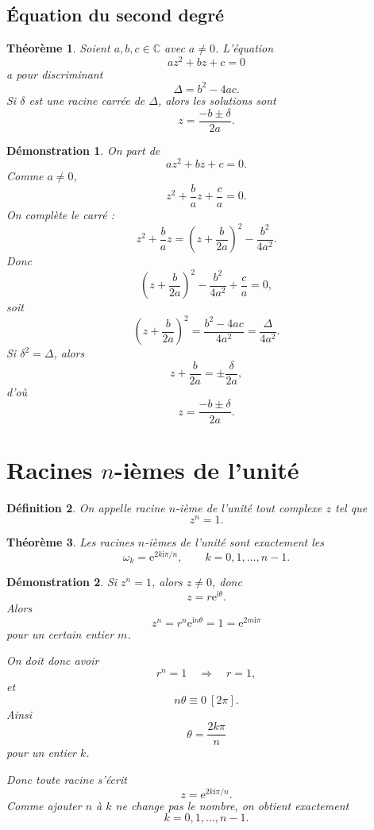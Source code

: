 \documentclass[11pt,a4paper]{article}
\newtheorem{definition}{Définition}[section]
\newtheorem{theoreme}[definition]{Théorème}
\newtheorem*{demonstration}{Démonstration}
\newcommand{\C}{\mathbb{C}}
\newcommand{\ii}{\mathrm{i}}
\newcommand{\e}{\mathrm{e}}
\begin{document}
\subsection{Équation du second degré}

\begin{theoreme}
Soient $a,b,c\in \C$ avec $a\neq 0$. L'équation
\[
az^2+bz+c=0
\]
a pour discriminant
\[
\Delta=b^2-4ac.
\]
Si $\delta$ est une racine carrée de $\Delta$, alors les solutions sont
\[
z=\frac{-b\pm \delta}{2a}.
\]
\end{theoreme}

\begin{demonstration}
On part de
\[
az^2+bz+c=0.
\]
Comme $a\neq 0$,
\[
z^2+\frac{b}{a}z+\frac{c}{a}=0.
\]
On complète le carré :
\[
z^2+\frac{b}{a}z
=
\left(z+\frac{b}{2a}\right)^2-\frac{b^2}{4a^2}.
\]
Donc
\[
\left(z+\frac{b}{2a}\right)^2-\frac{b^2}{4a^2}+\frac{c}{a}=0,
\]
soit
\[
\left(z+\frac{b}{2a}\right)^2
=\frac{b^2-4ac}{4a^2}
=\frac{\Delta}{4a^2}.
\]
Si $\delta^2=\Delta$, alors
\[
z+\frac{b}{2a}=\pm \frac{\delta}{2a},
\]
d'où
\[
z=\frac{-b\pm \delta}{2a}.
\]
\end{demonstration}

\section{Racines $n$-ièmes de l'unité}

\begin{definition}
On appelle \emph{racine $n$-ième de l'unité} tout complexe $z$ tel que
\[
z^n=1.
\]
\end{definition}

\begin{theoreme}
Les racines $n$-ièmes de l'unité sont exactement les
\[
\omega_k=\e^{2k\ii\pi/n},
\qquad k=0,1,\dots,n-1.
\]
\end{theoreme}

\begin{demonstration}
Si $z^n=1$, alors $z\neq 0$, donc
\[
z=r\e^{\ii\theta}.
\]
Alors
\[
z^n=r^n\e^{\ii n\theta}=1=\e^{2m\ii\pi}
\]
pour un certain entier $m$.

On doit donc avoir
\[
r^n=1 \quad \Rightarrow \quad r=1,
\]
et
\[
n\theta\equiv 0 \ [2\pi].
\]
Ainsi
\[
\theta=\frac{2k\pi}{n}
\]
pour un entier $k$.

Donc toute racine s'écrit
\[
z=\e^{2k\ii\pi/n}.
\]
Comme ajouter $n$ à $k$ ne change pas le nombre, on obtient exactement
\[
k=0,1,\dots,n-1.
\]
\end{demonstration}
\end{document}
